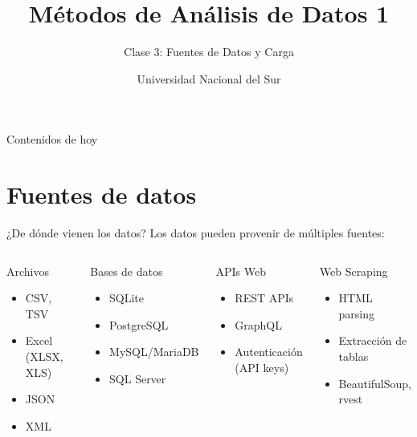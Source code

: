 \documentclass[aspectratio=169]{beamer}
\title{Métodos de Análisis de Datos 1}
\subtitle{Clase 3: Fuentes de Datos y Carga}
\author{Universidad Nacional del Sur}
\date{}
\begin{document}
\begin{frame}
\titlepage
\end{frame}

\begin{frame}{Contenidos de hoy}
\tableofcontents
\end{frame}

\section{Fuentes de datos}

\begin{frame}{¿De dónde vienen los datos?}
Los datos pueden provenir de múltiples fuentes:

\begin{columns}[t]
\begin{block}{Archivos}
\begin{itemize}
    \item CSV, TSV
    \item Excel (XLSX, XLS)
    \item JSON
    \item XML
\end{itemize}
\end{block}

\begin{block}{Bases de datos}
\begin{itemize}
    \item SQLite
    \item PostgreSQL
    \item MySQL/MariaDB
    \item SQL Server
\end{itemize}
\end{block}

\begin{block}{APIs Web}
\begin{itemize}
    \item REST APIs
    \item GraphQL
    \item Autenticación (API keys)
\end{itemize}
\end{block}

\begin{block}{Web Scraping}
\begin{itemize}
    \item HTML parsing
    \item Extracción de tablas
    \item BeautifulSoup, rvest
\end{itemize}
\end{block}
\end{columns}
\end{frame}
\end{document}
